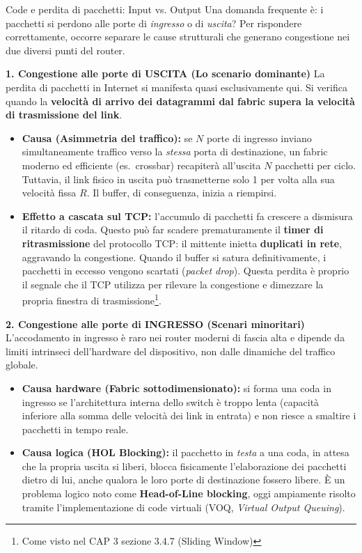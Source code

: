 \documentclass[a4paper,12pt]{report}
\begin{document}
\newpage
\begin{notebox}{Code e perdita di pacchetti: Input vs. Output}
Una domanda frequente è: i pacchetti si perdono alle porte di \emph{ingresso} o di \emph{uscita}? Per rispondere correttamente, occorre separare le cause strutturali che generano congestione nei due diversi punti del router.

\vspace{0.2cm}
\textbf{1. Congestione alle porte di USCITA (Lo scenario dominante)}
La perdita di pacchetti in Internet si manifesta quasi esclusivamente qui. Si verifica quando la \textbf{velocità di arrivo dei datagrammi dal fabric supera la velocità di trasmissione del link}.
\begin{itemize}
    \item \textbf{Causa (Asimmetria del traffico):} se $N$ porte di ingresso inviano simultaneamente traffico verso la \emph{stessa} porta di destinazione, un fabric moderno ed efficiente (es.\ crossbar) recapiterà all'uscita $N$ pacchetti per ciclo. Tuttavia, il link fisico in uscita può trasmetterne solo 1 per volta alla sua velocità fissa $R$. Il buffer, di conseguenza, inizia a riempirsi.
    \item \textbf{Effetto a cascata sul TCP:} l'accumulo di pacchetti fa crescere a dismisura il ritardo di coda. Questo può far scadere prematuramente il \textbf{timer di ritrasmissione} del protocollo TCP: il mittente inietta \textbf{duplicati in rete}, aggravando la congestione. Quando il buffer si satura definitivamente, i pacchetti in eccesso vengono scartati (\emph{packet drop}). Questa perdita è proprio il segnale che il TCP utilizza per rilevare la congestione e dimezzare la propria finestra di trasmissione\footnote{Come visto nel CAP 3 sezione 3.4.7 (Sliding Window)}.
\end{itemize}

\vspace{0.2cm}
\textbf{2. Congestione alle porte di INGRESSO (Scenari minoritari)}
L'accodamento in ingresso è raro nei router moderni di fascia alta e dipende da limiti intrinseci dell'hardware del dispositivo, non dalle dinamiche del traffico globale.
\begin{itemize}
    \item \textbf{Causa hardware (Fabric sottodimensionato):} si forma una coda in ingresso se l'architettura interna dello switch è troppo lenta (capacità inferiore alla somma delle velocità dei link in entrata) e non riesce a smaltire i pacchetti in tempo reale.
    \item \textbf{Causa logica (HOL Blocking):} il pacchetto in \emph{testa} a una coda, in attesa che la propria uscita si liberi, blocca fisicamente l'elaborazione dei pacchetti dietro di lui, anche qualora le loro porte di destinazione fossero libere. È un problema logico noto come \textbf{Head-of-Line blocking}, oggi ampiamente risolto tramite l'implementazione di code virtuali (VOQ, \textit{Virtual Output Queuing}).
\end{itemize}


\end{notebox}
\end{document}
